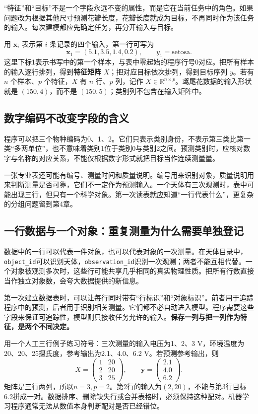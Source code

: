 “特征”和“目标”不是一个字段永远不变的属性，而是它在当前任务中的角色。如果问题改为根据其他尺寸预测花瓣长度，花瓣长度就成为目标，不再同时作为该任务的输入。每次建模都应先确定任务，再分开输入与目标。

用 $\mathbf x_i$ 表示第 $i$ 条记录的四个输入，第一行可写为
\[
\mathbf x_1=(5.1,3.5,1.4,0.2),\qquad y_1=\text{setosa}.
\]
这里下标1表示书写中的第一个样本，与表中零起始的程序行号0对应。把所有样本的输入逐行排列，得到\textbf{特征矩阵} $X$；把对应目标依次排列，得到目标序列 $y$。若有 $n$ 个样本、$p$ 个特征，$X$ 有 $n$ 行、$p$ 列，记作 $X\in\mathbb R^{n\times p}$。鸢尾花数据的输入形状就是 $(150,4)$，而不是 $(150,5)$；类别列不包含在输入矩阵中。

\subsection{数字编码不改变字段的含义}
程序可以把三个物种编码为0、1、2。它们只表示类别身份，不表示第三类比第一类“多两单位”，也不意味着类别1位于类别0与类别2之间。预测类别时，应核对数字与名称的对应关系，不能仅根据数字形式就把目标当作连续测量量。

一张专业表还可能有编号、测量时间和质量说明。编号用来识别对象，质量说明用来判断测量是否可靠，它们不一定作为预测输入。一个天体有三次观测时，表中可能出现三行，但只有一个科学对象。第一次读表就应知道“一行代表什么”，更复杂的分组问题留到第4章。

\subsection{一行数据与一个对象：重复测量为什么需要单独登记}
数据中的一行可以代表一件对象，也可以代表对象的一次测量。在天体目录中，\texttt{object\_id}可以识别天体，\texttt{observation\_id}识别一次观测；两者不能互相代替。一个对象被观测多次时，这些行可能共享几乎相同的真实物理性质。把所有行数直接当作独立对象数，会夸大数据提供的新信息。

第一次建立数据表时，可以让每行同时带有“行标识”和“对象标识”。前者用于追踪程序中的预测，后者用于识别相关测量。它们都不必自动进入模型。程序需要这些字段来保证可追踪性，模型则只接收任务允许的输入。\textbf{保存一列与把一列作为特征，是两个不同决定。}

用一个人工三行例子练习符号：三次测量的输入电压为1、2、3 V，环境温度为20、20、25摄氏度，参考输出为2.1、4.0、6.2 V。若预测参考输出，则
\[
X=\begin{pmatrix}1&20\\2&20\\3&25\end{pmatrix},\qquad
\mathbf y=\begin{pmatrix}2.1\\4.0\\6.2\end{pmatrix}.
\]
矩阵是三行两列，所以$n=3,p=2$。第2行的输入为$(2,20)$，不能与第3行目标6.2拼成一对。数据排序、删除缺失行或合并表格时，必须保持这种配对。机器学习程序通常无法从数值本身判断配对是否已经错位。

